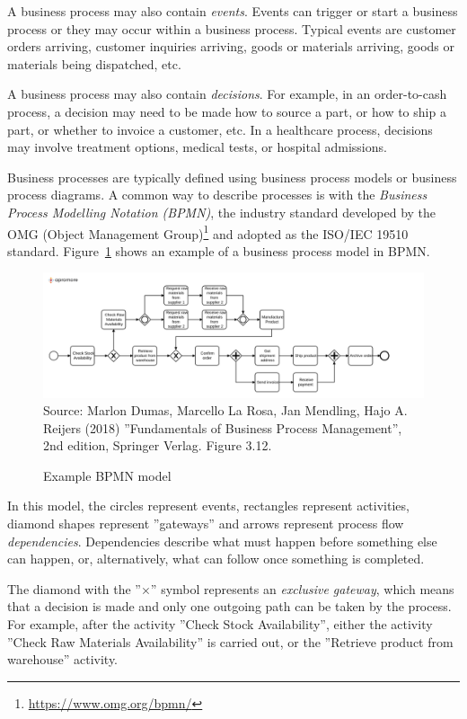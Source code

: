 A business process may also contain \emph{events}. Events can trigger or start a business process or they may occur within a business process. Typical events are customer orders arriving, customer inquiries arriving, goods or materials arriving, goods or materials being dispatched, etc. 

A business process may also contain \emph{decisions}. For example, in an order-to-cash process, a decision may need to be made how to source a part, or how to ship a part, or whether to invoice a customer, etc. In a healthcare process, decisions may involve treatment options, medical tests, or hospital admissions.

Business processes are typically defined using business process models or business process diagrams. A common way to describe processes is with the \emph{Business Process Modelling Notation (BPMN)}, the industry standard developed by the OMG (Object Management Group)\footnote{\url{https://www.omg.org/bpmn/}} and adopted as the ISO/IEC 19510 standard. Figure~\ref{fig:bpmn} shows an example of a business process model in BPMN.

\begin{figure}
\centering
\includegraphics[width=1.1\textwidth]{Figure3.12.pdf} \\

\scriptsize Source: Marlon Dumas, Marcello La Rosa, Jan Mendling, Hajo A. Reijers (2018) ''Fundamentals of Business Process Management'', 2nd edition, Springer Verlag. Figure 3.12.
\caption{Example BPMN model}
\label{fig:bpmn}
\end{figure}

In this model, the circles represent events, rectangles represent activities, diamond shapes represent ''gateways'' and arrows represent process flow \emph{dependencies}. Dependencies describe what must happen before something else can happen, or, alternatively, what can follow once something is completed. 

The diamond with the ''$\times$'' symbol represents an \emph{exclusive gateway}, which means that a decision is made and only one outgoing path can be taken by the process. For example, after the activity ''Check Stock Availability'', either the activity ''Check Raw Materials Availability'' is carried out, or the ''Retrieve product from warehouse'' activity. 

